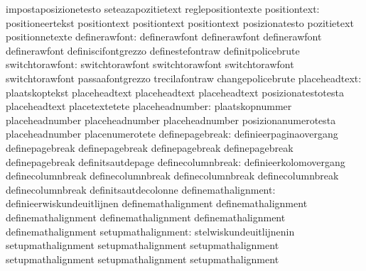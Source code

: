                                  impostaposizionetesto            seteazapozitietext
                                  reglepositiontexte
                    positiontext: positioneertekst                 positiontext
                                  positiontext                     positiontext
                                  posizionatesto                   pozitietext
                                  positionnetexte
                   definerawfont: definerawfont                    definerawfont
                                  definerawfont                    definerawfont
                                  definiscifontgrezzo              definestefontraw
                                  definitpolicebrute
                 switchtorawfont: switchtorawfont                  switchtorawfont
                                  switchtorawfont                  switchtorawfont
                                  passaafontgrezzo                 trecilafontraw
                                  changepolicebrute
                   placeheadtext: plaatskoptekst                   placeheadtext
                                  placeheadtext                    placeheadtext
                                  posizionatestotesta              placeheadtext
                                  placetextetete
                 placeheadnumber: plaatskopnummer                  placeheadnumber
                                  placeheadnumber                  placeheadnumber
                                  posizionanumerotesta             placeheadnumber
                                  placenumerotete
                 definepagebreak: definieerpaginaovergang          definepagebreak
                                  definepagebreak                  definepagebreak
                                  definepagebreak                  definepagebreak
                                  definitsautdepage
               definecolumnbreak: definieerkolomovergang           definecolumnbreak
                                  definecolumnbreak                definecolumnbreak
                                  definecolumnbreak                definecolumnbreak
                                  definitsautdecolonne
             definemathalignment: definieerwiskundeuitlijnen       definemathalignment
                                  definemathalignment              definemathalignment
                                  definemathalignment              definemathalignment
                                  definemathalignment
              setupmathalignment: stelwiskundeuitlijnenin          setupmathalignment
                                  setupmathalignment               setupmathalignment
                                  setupmathalignment               setupmathalignment
                                  setupmathalignment

